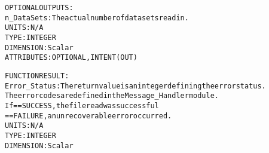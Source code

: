 \begin{alltt}
  OPTIONAL OUTPUTS:
        n_DataSets:     The actual number of datasets read in.
                        UNITS:      N/A
                        TYPE:       INTEGER
                        DIMENSION:  Scalar
                        ATTRIBUTES: OPTIONAL, INTENT(OUT)
 
  FUNCTION RESULT:
        Error_Status:   The return value is an integer defining the error status.
                        The error codes are defined in the Message_Handler module.
                        If == SUCCESS, the file read was successful
                           == FAILURE, an unrecoverable error occurred.
                        UNITS:      N/A
                        TYPE:       INTEGER
                        DIMENSION:  Scalar
 
  \end{alltt}
